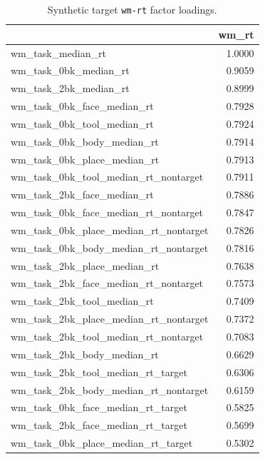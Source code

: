 \documentclass{article}
\begin{document}
\begin{table}[H]
\caption{Synthetic target \texttt{wm-rt} factor loadings.}\label{tab:wm-rt}
\centering
\begin{tabular}{lr}
\toprule
 & wm\_rt \\
\midrule
wm\_task\_median\_rt & 1.0000 \\
wm\_task\_0bk\_median\_rt & 0.9059 \\
wm\_task\_2bk\_median\_rt & 0.8999 \\
wm\_task\_0bk\_face\_median\_rt & 0.7928 \\
wm\_task\_0bk\_tool\_median\_rt & 0.7924 \\
wm\_task\_0bk\_body\_median\_rt & 0.7914 \\
wm\_task\_0bk\_place\_median\_rt & 0.7913 \\
wm\_task\_0bk\_tool\_median\_rt\_nontarget & 0.7911 \\
wm\_task\_2bk\_face\_median\_rt & 0.7886 \\
wm\_task\_0bk\_face\_median\_rt\_nontarget & 0.7847 \\
wm\_task\_0bk\_place\_median\_rt\_nontarget & 0.7826 \\
wm\_task\_0bk\_body\_median\_rt\_nontarget & 0.7816 \\
wm\_task\_2bk\_place\_median\_rt & 0.7638 \\
wm\_task\_2bk\_face\_median\_rt\_nontarget & 0.7573 \\
wm\_task\_2bk\_tool\_median\_rt & 0.7409 \\
wm\_task\_2bk\_place\_median\_rt\_nontarget & 0.7372 \\
wm\_task\_2bk\_tool\_median\_rt\_nontarget & 0.7083 \\
wm\_task\_2bk\_body\_median\_rt & 0.6629 \\
wm\_task\_2bk\_tool\_median\_rt\_target & 0.6306 \\
wm\_task\_2bk\_body\_median\_rt\_nontarget & 0.6159 \\
wm\_task\_0bk\_face\_median\_rt\_target & 0.5825 \\
wm\_task\_2bk\_face\_median\_rt\_target & 0.5699 \\
wm\_task\_0bk\_place\_median\_rt\_target & 0.5302 \\
\bottomrule
\end{tabular}

\end{table}
\end{document}
